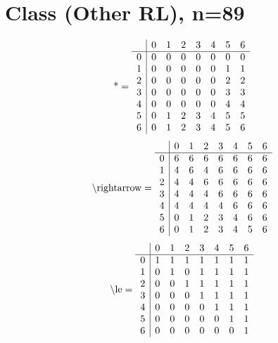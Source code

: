 \documentclass[11pt]{article}
\begin{document}
\section{Class (Other RL), n=89}
\[\text{*} = 
\begin{array}{r | r r r r r r r}
 & 0 & 1 & 2 & 3 & 4 & 5 & 6 \\ \hline
0 & 0 & 0 & 0 & 0 & 0 & 0 & 0 \\
1 & 0 & 0 & 0 & 0 & 0 & 1 & 1 \\
2 & 0 & 0 & 0 & 0 & 0 & 2 & 2 \\
3 & 0 & 0 & 0 & 0 & 0 & 3 & 3 \\
4 & 0 & 0 & 0 & 0 & 0 & 4 & 4 \\
5 & 0 & 1 & 2 & 3 & 4 & 5 & 5 \\
6 & 0 & 1 & 2 & 3 & 4 & 5 & 6 \\
\end{array}
\]
\[\text{\textbackslash rightarrow} = 
\begin{array}{r | r r r r r r r}
 & 0 & 1 & 2 & 3 & 4 & 5 & 6 \\ \hline
0 & 6 & 6 & 6 & 6 & 6 & 6 & 6 \\
1 & 4 & 6 & 4 & 6 & 6 & 6 & 6 \\
2 & 4 & 4 & 6 & 6 & 6 & 6 & 6 \\
3 & 4 & 4 & 4 & 6 & 6 & 6 & 6 \\
4 & 4 & 4 & 4 & 4 & 6 & 6 & 6 \\
5 & 0 & 1 & 2 & 3 & 4 & 6 & 6 \\
6 & 0 & 1 & 2 & 3 & 4 & 5 & 6 \\
\end{array}
\]
\[\text{\textbackslash le} = 
\begin{array}{r | r r r r r r r}
 & 0 & 1 & 2 & 3 & 4 & 5 & 6 \\ \hline
0 & 1 & 1 & 1 & 1 & 1 & 1 & 1 \\
1 & 0 & 1 & 0 & 1 & 1 & 1 & 1 \\
2 & 0 & 0 & 1 & 1 & 1 & 1 & 1 \\
3 & 0 & 0 & 0 & 1 & 1 & 1 & 1 \\
4 & 0 & 0 & 0 & 0 & 1 & 1 & 1 \\
5 & 0 & 0 & 0 & 0 & 0 & 1 & 1 \\
6 & 0 & 0 & 0 & 0 & 0 & 0 & 1 \\
\end{array}
\]
\end{document}
